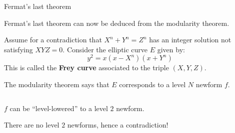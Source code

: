 \documentclass[10pt]{beamer}
\theoremstyle{definition}
\begin{document}
\begin{frame}[t]{Fermat's last theorem}

Fermat's last theorem can now be deduced from the modularity theorem.

\vspace{0.5cm} Assume for a contradiction that $ X^n + Y^n = Z^n $ has an integer solution not satisfying $ XYZ = 0 $. Consider the elliptic curve $ E $ given by:
$$ y^2 = x(x - X^n)(x + Y^n) $$
This is called the \textbf{Frey curve} associated to the triple $ (X, Y, Z) $.

\vspace{0.5cm} The modularity theorem says that $ E $ corresponds to a level $ N $ newform $ f $.

\begin{columns}[T]

\begin{column}{0.8\textwidth}
\vspace{0.5cm}

\begin{theorem}[Ribet]
$ f $ can be ``level-lowered'' to a level $ 2 $ newform.
\end{theorem}

\vspace{0.5cm} There are no level $ 2 $ newforms, hence a contradiction!
\end{column}


\end{columns}
\end{frame}
\end{document}

